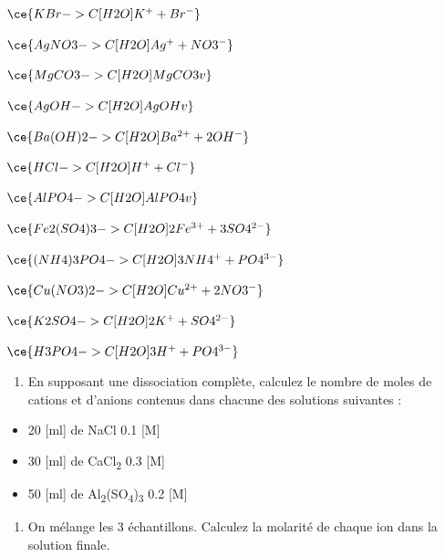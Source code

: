 \documentclass[
  11pt,
  a4paper,
  openany]{book}
\providecommand{\tightlist}{%
  \setlength{\itemsep}{0pt}\setlength{\parskip}{0pt}}
\begin{document}
\begin{Answer}

\begin{multicols}{2}
\(\ce{KBr ->C[H2O] K^{+} + Br^{-} }\)

\(\ce{AgNO3 ->C[H2O] Ag^{+} + NO3^{-} }\)

\(\ce{MgCO3 ->C[H2O] MgCO3 v }\)

\(\ce{AgOH ->C[H2O] AgOH v }\)

\(\ce{Ba(OH)2 ->C[H2O] Ba^{2+} + 2OH^{-} }\)

\(\ce{HCl ->C[H2O] H^{+} + Cl^{-}}\)

\(\ce{AlPO4 ->C[H2O] AlPO4 v }\)

\(\ce{Fe2(SO4)3 ->C[H2O] 2Fe^{3+} + 3SO4^{2-} }\)

\(\ce{(NH4)3PO4 ->C[H2O] 3NH4^{+} + PO4^{3-} }\)

\(\ce{Cu(NO3)2 ->C[H2O] Cu^{2+} + 2NO3^{-} }\)

\(\ce{K2SO4 ->C[H2O] 2K^{+} + SO4^{2-} }\)

\(\ce{H3PO4 ->C[H2O] 3H^{+} + PO4^{3-} }\)

\end{multicols}

\end{Answer}

\begin{Exercise}

\begin{enumerate}
\def\labelenumi{\arabic{enumi}.}
\tightlist
\item
  En supposant une dissociation complète, calculez le nombre de moles de cations et d'anions contenus dans chacune des solutions suivantes :
\end{enumerate}

\begin{itemize}
\tightlist
\item
  20 {[}ml{]} de NaCl 0.1 {[}M{]}\\
\item
  30 {[}ml{]} de CaCl\textsubscript{2} 0.3 {[}M{]}\\
\item
  50 {[}ml{]} de Al\textsubscript{2}(SO\textsubscript{4})\textsubscript{3} 0.2 {[}M{]}\\
\end{itemize}

\begin{enumerate}
\def\labelenumi{\arabic{enumi}.}
\setcounter{enumi}{1}
\tightlist
\item
  On mélange les 3 échantillons. Calculez la molarité de chaque ion dans la solution finale.\\
\end{enumerate}

\end{Exercise}
\end{document}
